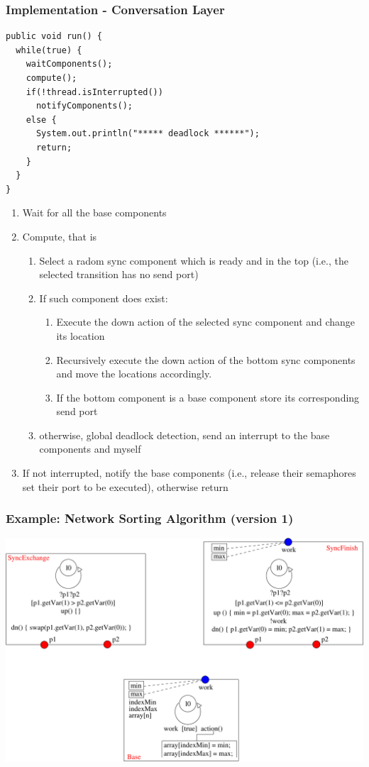 \documentclass[compress,xcolor=dvipsnames,10pt]{beamer}
\begin{document}
\begin{frame}[fragile]
 \frametitle{Implementation - Conversation Layer}

       \begin{lstlisting}[style=customjava, basicstyle=\ttfamily\tiny]
public void run() {
  while(true) {
    waitComponents();
    compute();
    if(!thread.isInterrupted())
      notifyComponents();
    else {
      System.out.println("***** deadlock ******");
      return;
    }
  }
}
\end{lstlisting}
\begin{enumerate}
\item Wait for all the base components
\item Compute, that is
\begin{enumerate}
\item Select a radom sync component which is ready and in the top (i.e., the selected transition has no send port)
\item If such component does exist:
\begin{enumerate}
 \item Execute the down action of the selected sync component and change its location
\item Recursively execute the down action of the bottom sync components and move the locations accordingly. 
\item If the bottom component is a base component store its corresponding send port   
\end{enumerate}
\item otherwise, global deadlock detection, send an interrupt to the base components and myself 
\end{enumerate}
\item If not interrupted, notify the base components (i.e., release their semaphores set their port to be executed), otherwise return 
\end{enumerate}

\end{frame}


\begin{frame}
 \frametitle{Example: Network Sorting Algorithm (version 1)}
 \begin{center}
  \includegraphics[scale=0.45]{figs/nsa1v1.pdf}
 \end{center}

\end{frame}
\end{document}
